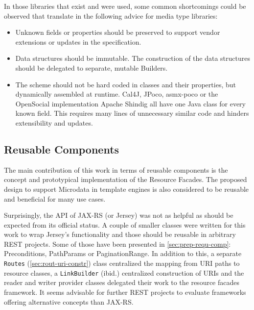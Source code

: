 \documentclass[11pt,a4paper,headsepline,twoside]{scrartcl}		%
\begin{document}
In those libraries that exist and were used, some common shortcomings could be
observed that translate in the following advice for media type libraries:

\begin{itemize}
\item Unknown fields or properties should be preserved to support vendor
  extensions or updates in the specification.
\item Data structures should be immutable. The construction of the data
  structures should be delegated to separate, mutable Builders.
\item The scheme should not be hard coded in classes and their properties, but
  dynamically assembled at runtime. Cal4J, JPoco, asmx-poco or the OpenSocial
  implementation Apache Shindig all have one Java class for every known field.
  This requires many lines of unnecessary similar code and hinders extensibility
  and updates.
\end{itemize}

\subsection{Reusable Components}
\label{sec:reusable-components}

The main contribution of this work in terms of reusable components is the
concept and prototypical implementation of the Resource Facades. The proposed
design to support Microdata in template engines is also considered to be
reusable and beneficial for many use cases.

Surprisingly, the API of JAX-RS (or Jersey) was not as helpful as should be
expected from its official status. A couple of smaller classes were written for
this work to wrap Jersey's functionality and those should be reusable in
arbitrary REST projects. Some of those have been presented in
\autoref{sec:prep-requ-comp}: Preconditions, PathParams or PaginationRange. In
addition to this, a separate \lstinline:Routes: (\autoref{sec:rout-uri-constr})
class centralized the mapping from URI paths to resource classes, a
\lstinline:LinkBuilder: (ibid.) centralized construction of URIs and the reader
and writer provider classes delegated their work to the resource facades
framework. It seems advisable for further REST projects to evaluate frameworks
offering alternative concepts than JAX-RS.

\end{document}
